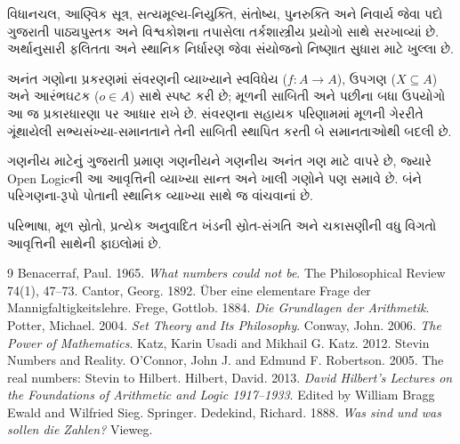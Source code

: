 વિધાનચલ, આણ્વિક સૂત્ર, સત્યમૂલ્ય-નિયુક્તિ, સંતોષ્ય, પુનરુક્તિ અને
નિવાર્ય જેવા પદો ગુજરાતી પાઠ્યપુસ્તક અને વિશ્વકોશના તપાસેલા
તર્કશાસ્ત્રીય પ્રયોગો સાથે સરખાવ્યાં છે. અર્થાનુસારી ફલિતતા અને
સ્થાનિક નિર્ધારણ જેવા સંયોજનો નિષ્ણાત સુધારા માટે ખુલ્લા છે.

અનંત ગણોના પ્રકરણમાં સંવરણની વ્યાખ્યાને સ્વવિધેય ($f\colon A\to A$),
ઉપગણ ($X\subseteq A$) અને આરંભઘટક ($o\in A$) સાથે સ્પષ્ટ કરી છે;
મૂળની સાબિતી અને પછીના બધા ઉપયોગો આ જ પ્રકારધારણા પર આધાર રાખે છે.
સંવરણના સહાયક પરિણામમાં મૂળની ગેરરીતે ગૂંથાયેલી સભ્યસંખ્યા-સમાનતાને
તેની સાબિતી સ્થાપિત કરતી બે સમાનતાઓથી બદલી છે.

ગણનીય માટેનું ગુજરાતી પ્રમાણ ગણનીયને ગણનીય અનંત ગણ માટે વાપરે છે,
જ્યારે Open Logicની આ આવૃત્તિની વ્યાખ્યા સાન્ત અને ખાલી ગણોને પણ
સમાવે છે. બંને પરિગણના-રૂપો પોતાની સ્થાનિક વ્યાખ્યા સાથે જ વાંચવાનાં છે.

પરિભાષા, મૂળ સ્રોતો, પ્રત્યેક અનુવાદિત ખંડની સ્રોત-સંગતિ અને
ચકાસણીની વધુ વિગતો આવૃત્તિની સાથેની ફાઇલોમાં છે.
\begin{thebibliography}{9}
Benacerraf, Paul. 1965. \emph{What numbers could not be}.
The Philosophical Review 74(1), 47--73.
Cantor, Georg. 1892. Über eine elementare Frage der Mannigfaltigkeitslehre.
Frege, Gottlob. 1884. \emph{Die Grundlagen der Arithmetik}.
Potter, Michael. 2004. \emph{Set Theory and Its Philosophy}.
Conway, John. 2006. \emph{The Power of Mathematics}.
Katz, Karin Usadi and Mikhail G. Katz. 2012. Stevin Numbers and Reality.
O'Connor, John J. and Edmund F. Robertson. 2005. The real numbers: Stevin to Hilbert.
Hilbert, David. 2013. \emph{David Hilbert's Lectures on the Foundations of Arithmetic and Logic 1917--1933}.
Edited by William Bragg Ewald and Wilfried Sieg. Springer.
Dedekind, Richard. 1888. \emph{Was sind und was sollen die Zahlen?} Vieweg.
\end{thebibliography}

